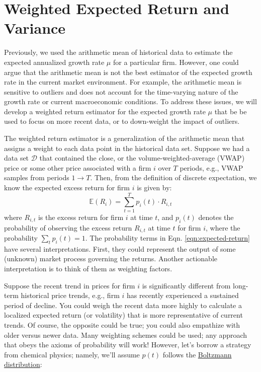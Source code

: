 \documentclass[11pt]{article}
\theoremstyle{definition}
\begin{document}
\section*{Weighted Expected Return and Variance}
Previously, we used the arithmetic mean of historical data to estimate the expected annualized growth rate $\mu$ for a particular firm.
However, one could argue that the arithmetic mean is not the best estimator of the expected growth rate in the current market environment.
For example, the arithmetic mean is sensitive to outliers and does not account for the time-varying nature of the growth rate 
or current macroeconomic conditions. To address these issues, we will develop a weighted return estimator for the expected growth rate $\mu$
that be be used to focus on more recent data, or to down-weight the impact of outliers. 

The weighted return estimator is a generalization of the arithmetic mean that assigns a weight to each data point in the historical data set.
Suppose we had a data set $\mathcal{D}$ that contained the close, or the volume-weighted-average (VWAP) price 
or some other price associated with a firm $i$ over $T$ periods, e.g., VWAP samples from periods $1\rightarrow{T}$.
Then, from the definition of discrete expectation, we know the expected excess return for firm $i$ is given by:
\begin{equation}\label{eqn:expected-return}
\mathbb{E}\left(R_{i}\right) = \sum_{t=1}^{T}p_{i}(t)\cdot{R_{i,t}}
\end{equation}
where $R_{i,t}$ is the excess return for firm $i$ at time $t$, 
and $p_{i}(t)$ denotes the probability of observing the excess return $R_{i,t}$ at time $t$ for firm $i$, 
where the probability $\sum_{t}p_{i}(t) = 1$. 
The probability terms in Eqn. \eqref{eqn:expected-return} have several interpretations. 
First, they could represent the output of some (unknown) market process governing the returns. 
Another actionable interpretation is to think of them as weighting factors. 

Suppose the recent trend in prices for firm $i$ is significantly different from long-term historical price trends, 
e.g., firm $i$ has recently experienced a sustained period of decline. 
You could weigh the recent data more highly to calculate a localized expected return (or volatility) 
that is more representative of current trends. 
Of course, the opposite could be true; you could also empathize with older versus newer data. Many weighting schemes could be used; any approach that obeys the axioms of probability will work!
However, let's borrow a strategy from chemical physics; namely, we'll assume $p(t)$ follows the 
\href{https://en.wikipedia.org/wiki/Boltzmann_distribution}{Boltzmann distribution}:
\end{document}
